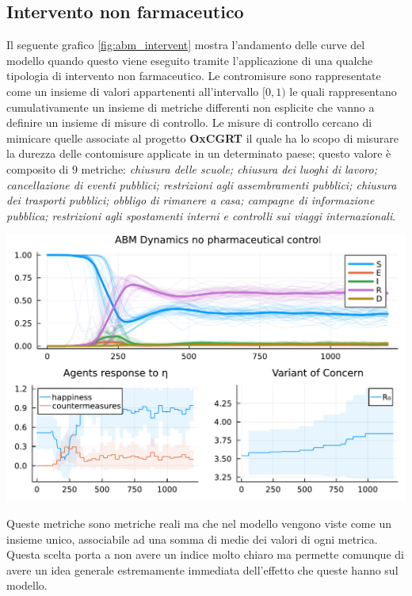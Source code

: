 \subsection{Intervento non farmaceutico}
Il seguente grafico \ref{fig:abm_intervent} mostra l'andamento delle curve del modello
quando questo viene eseguito tramite l'applicazione di una qualche tipologia di intervento non farmaceutico. 
Le contromisure sono rappresentate come un insieme di valori appartenenti all'intervallo $[0, 1)$ 
le quali rappresentano cumulativamente un insieme di metriche differenti non esplicite che vanno a definire 
un insieme di misure di controllo. Le misure di controllo cercano di mimicare quelle associate al progetto 
\textbf{OxCGRT} il quale ha lo scopo di misurare la durezza delle contomisure applicate in un determinato paese; 
questo valore è composito di 9 metriche: \emph{chiusura delle scuole; chiusura dei luoghi di lavoro; 
cancellazione di eventi pubblici; restrizioni agli assembramenti pubblici; 
chiusura dei trasporti pubblici; obbligo di rimanere a casa; campagne di informazione pubblica; 
restrizioni agli spostamenti interni e controlli sui viaggi internazionali}.

\begin{minipage}{\linewidth}
	\centering
	\includegraphics[width=\textwidth]{img/SocialNetworkABM_CONTROL.pdf}
	\label{fig:abm_intervent}
\end{minipage}

Queste metriche sono metriche reali ma che nel modello vengono viste come un insieme unico, associabile 
ad una somma di medie dei valori di ogni metrica. Questa scelta porta a non avere un indice molto chiaro
ma permette comunque di avere un idea generale estremamente immediata dell'effetto che queste hanno sul modello.

